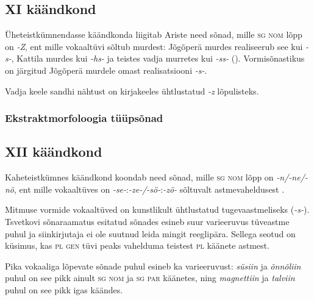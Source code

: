 \documentclass[12pt,a4paper]{article}
\newcommand{\vadja}[1]{\textit{#1}}
\newcommand{\msd}[1]{\textsc{#1}}
\begin{document}
\subsection{\RN{11} käändkond}

Üheteistkümnendasse käändkonda liigitab Ariste need sõnad, mille \msd{sg nom} lõpp on \vadja{{-Z}}, ent mille vokaaltüvi sõltub murdest: Jõgõperä murdes realiseerub see kui \vadja{-s-}, Kattila murdes kui \textit{-hs-} ja teistes vadja murretes kui \textit{-ss-} (\cite[48]{ariste_grammar_1968}). Vormisõnastikus on järgitud Jõgõperä murdele omast realisatsiooni \textit{-s-}.

Vadja keele sandhi nähtust on kirjakeeles ühtlustatud \vadja{-z} lõpulisteks.


\subsubsection*{Ekstraktmorfoloogia tüüpsõnad}
\vspace{-3.5em}




\subsection{\RN{12} käändkond}

Kaheteistkümnes käändkond koondab need sõnad, mille \msd{sg nom} lõpp on \vadja{-n/-ne/-nõ}, ent mille vokaaltüves on \vadja{-se-}:\vadja{-ze-/-sö-}:\vadja{-zö-} sõltuvalt astmevaheldusest \cite[49]{ariste_grammar_1968}.

Mitmuse vormide vokaaltüved on kunstlikult ühtlustatud tugevaastmeliseks (\textit{-s-}). Tsvetkovi sõnaraamatus esitatud sõnades esineb suur varieeruvus tüve\-astme puhul ja siin\-kirjutaja ei ole suutnud leida mingit reeglipära. Sellega seotud on küsimus, kas \msd{pl gen} tüvi peaks vahelduma teistest \msd{pl} käänete astmest.

Pika vokaaliga lõpevate sõnade puhul esineb ka varieeruvust: \textit{süsiin} ja \textit{õnnõliin} puhul on see pikk ainult \msd{sg nom} ja \msd{sg par} käänetes, ning \textit{magnettiin} ja \textit{talviin} puhul on see pikk igas käändes.
\end{document}
